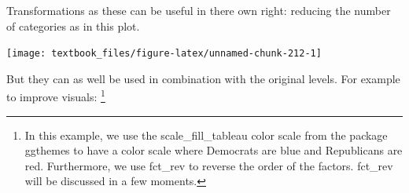 \documentclass[]{tufte-book}
\newenvironment{Shaded}{}{}
\newcommand{\DataTypeTok}[1]{\textcolor[rgb]{0.56,0.13,0.00}{#1}}
\newcommand{\KeywordTok}[1]{\textcolor[rgb]{0.00,0.44,0.13}{\textbf{#1}}}
\newcommand{\NormalTok}[1]{#1}
\newcommand{\OperatorTok}[1]{\textcolor[rgb]{0.40,0.40,0.40}{#1}}
\newcommand{\StringTok}[1]{\textcolor[rgb]{0.25,0.44,0.63}{#1}}
\begin{document}
\begin{Shaded}
\end{Shaded}

Transformations as these can be useful in there own right: reducing the number of categories as in this plot.

\begin{Shaded}
\end{Shaded}

\texttt{[image: textbook\_files/figure-latex/unnamed-chunk-212-1]}

But they can as well be used in combination with the original levels. For example to improve visuals: \footnote{In this example, we use the scale\_fill\_tableau color scale from the package ggthemes to have a color scale where Democrats are blue and Republicans are red. Furthermore, we use fct\_rev to reverse the order of the factors. fct\_rev will be discussed in a few moments.}
\end{document}
